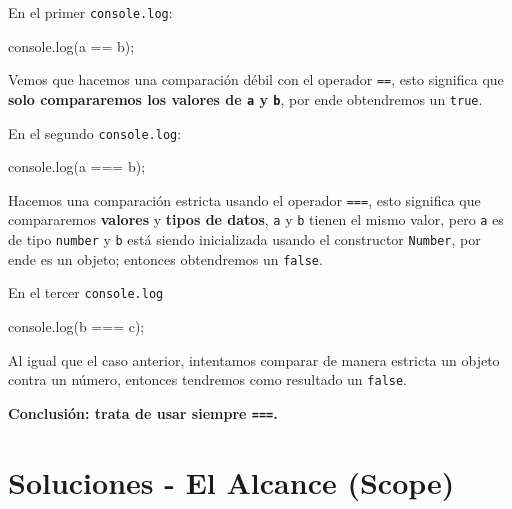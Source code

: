 \documentclass[
  letterpaper,
  DIV=11,
  numbers=noendperiod]{scrreprt}
\newenvironment{Shaded}{\begin{snugshade}}{\end{snugshade}}
\newcommand{\BuiltInTok}[1]{\textcolor[rgb]{0.00,0.23,0.31}{#1}}
\newcommand{\FunctionTok}[1]{\textcolor[rgb]{0.28,0.35,0.67}{#1}}
\newcommand{\NormalTok}[1]{\textcolor[rgb]{0.00,0.23,0.31}{#1}}
\newcommand{\OperatorTok}[1]{\textcolor[rgb]{0.37,0.37,0.37}{#1}}
\begin{document}
En el primer \texttt{console.log}:

\begin{Shaded}
\begin{Highlighting}[]
\BuiltInTok{console}\OperatorTok{.}\FunctionTok{log}\NormalTok{(a }\OperatorTok{==}\NormalTok{ b)}\OperatorTok{;}
\end{Highlighting}
\end{Shaded}

Vemos que hacemos una comparación débil con el operador \texttt{==},
esto significa que \textbf{solo compararemos los valores de \texttt{a} y
\texttt{b}}, por ende obtendremos un \texttt{true}.

En el segundo \texttt{console.log}:

\begin{Shaded}
\begin{Highlighting}[]
\BuiltInTok{console}\OperatorTok{.}\FunctionTok{log}\NormalTok{(a }\OperatorTok{===}\NormalTok{ b)}\OperatorTok{;}
\end{Highlighting}
\end{Shaded}

Hacemos una comparación estricta usando el operador \texttt{===}, esto
significa que compararemos \textbf{valores} y \textbf{tipos de datos},
\texttt{a} y \texttt{b} tienen el mismo valor, pero \texttt{a} es de
tipo \texttt{number} y \texttt{b} está siendo inicializada usando el
constructor \texttt{Number}, por ende es un objeto; entonces obtendremos
un \texttt{false}.

En el tercer \texttt{console.log}

\begin{Shaded}
\begin{Highlighting}[]
\BuiltInTok{console}\OperatorTok{.}\FunctionTok{log}\NormalTok{(b }\OperatorTok{===}\NormalTok{ c)}\OperatorTok{;}
\end{Highlighting}
\end{Shaded}

Al igual que el caso anterior, intentamos comparar de manera estricta un
objeto contra un número, entonces tendremos como resultado un
\texttt{false}.

\textbf{Conclusión: trata de usar siempre \texttt{===}.}

\chapter{Soluciones - El Alcance
(Scope)}\label{soluciones---el-alcance-scope}
\end{document}
